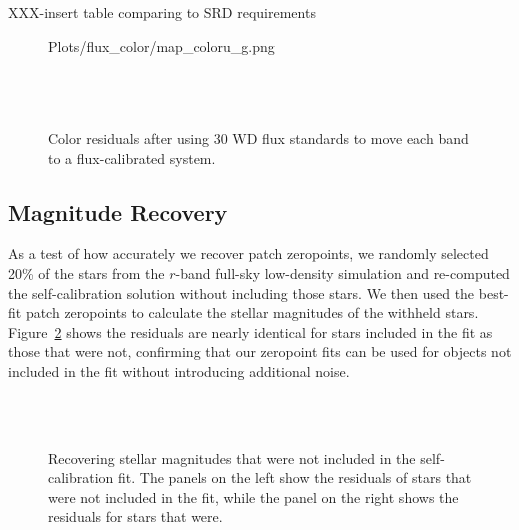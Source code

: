 \documentclass[12pt,preprint]{aastex}
\begin{document}
XXX-insert table comparing to SRD requirements







\begin{figure}
 {Plots/flux_color/map_coloru_g.png} \\
 \\
 \\
 \\
\caption{Color residuals after using 30 WD flux standards to move each band to a flux-calibrated system.   \label{fig:colorcolor}}
\end{figure}

\subsection{Magnitude Recovery}

As a test of how accurately we recover patch zeropoints, we randomly selected 20\% of the stars from the $r$-band full-sky low-density simulation and re-computed the self-calibration solution without including those stars.  We then used the best-fit patch zeropoints to calculate the stellar magnitudes of the withheld stars.  Figure~\ref{fig:zpcheck} shows the residuals are nearly identical for stars included in the fit as those that were not, confirming that our zeropoint fits can be used for objects not included in the fit without introducing additional noise.


\begin{figure}
 \\
 \\
\caption{Recovering stellar magnitudes that were not included in the self-calibration fit.  The panels on the left show the residuals of stars that were not included in the fit, while the panel on the right shows the residuals for stars that were.  \label{fig:zpcheck}}
\end{figure}
\end{document}
